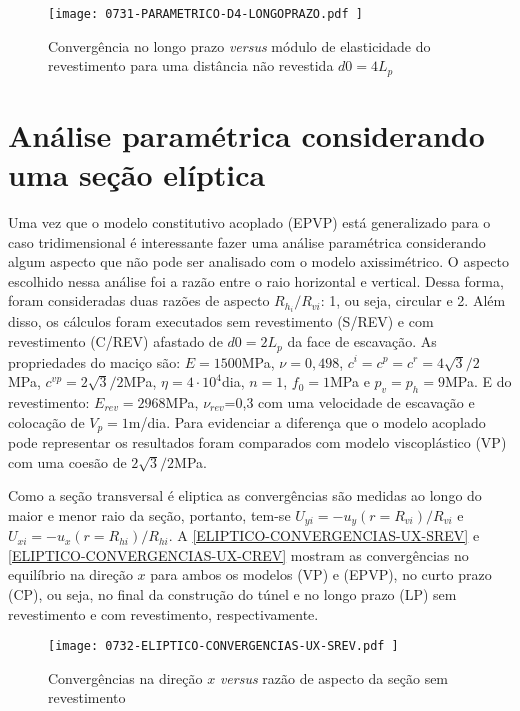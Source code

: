 \begin{figure}[H]
	\begin{center}
		\texttt{[image: 0731-PARAMETRICO-D4-LONGOPRAZO.pdf
		]}
	\end{center}
	\caption{\label{PARAMETRICO-D4-LONGOPRAZO}Convergência no longo prazo \textit{versus} módulo de elasticidade do revestimento para uma distância não revestida $d0=4L_p$}
\end{figure}

\section{Análise paramétrica considerando uma seção elíptica}

Uma vez que o modelo constitutivo acoplado (EPVP) está generalizado para o caso tridimensional é interessante fazer uma análise paramétrica considerando algum aspecto que não pode ser analisado com o modelo axissimétrico. O aspecto escolhido nessa análise foi a razão entre o raio horizontal e vertical. Dessa forma, foram consideradas duas razões de aspecto $R_{h_i}/R_{vi}$: 1, ou seja, circular e 2. Além disso, os cálculos foram executados sem revestimento (S/REV) e com revestimento (C/REV) afastado de $d0=2L_p$ da face de escavação. As propriedades do maciço são: $E=1500$MPa, $\nu=0,498$, $c^i=c^p=c^r =4\sqrt{3}/2$MPa, $c^{vp}=2\sqrt{3}/2$MPa, $\eta = 4 \cdot 10^4$dia, $n=1$, $f_0=1$MPa e $p_v=p_h=9$MPa. E do revestimento: $E_{rev}=2968$MPa, $\nu_{rev}$=0,3 com uma velocidade de escavação e colocação de $V_p=1$m/dia. Para evidenciar a diferença que o modelo acoplado pode representar os resultados foram comparados com modelo viscoplástico (VP) com uma coesão de $2\sqrt{3}/2$MPa.

Como a seção transversal é eliptica as convergências são medidas ao longo do maior e menor raio da seção, portanto,  tem-se $U_{yi} = -u_y(r=R_{vi})/R_{vi}$ e $U_{xi} = -u_x(r=R_{hi})/R_{hi}$.  A \autoref{ELIPTICO-CONVERGENCIAS-UX-SREV} e \autoref{ELIPTICO-CONVERGENCIAS-UX-CREV} mostram as convergências no equilíbrio na direção $x$ para ambos os modelos (VP) e (EPVP), no curto prazo (CP), ou seja, no final da construção do túnel e no longo prazo (LP) sem revestimento e com revestimento, respectivamente.


\begin{figure}[H]
	\begin{center}
		\texttt{[image: 0732-ELIPTICO-CONVERGENCIAS-UX-SREV.pdf
		]}
	\end{center}
	\caption{\label{ELIPTICO-CONVERGENCIAS-UX-SREV}Convergências na direção $x$ \textit{versus} razão de aspecto da seção sem revestimento}
\end{figure}


